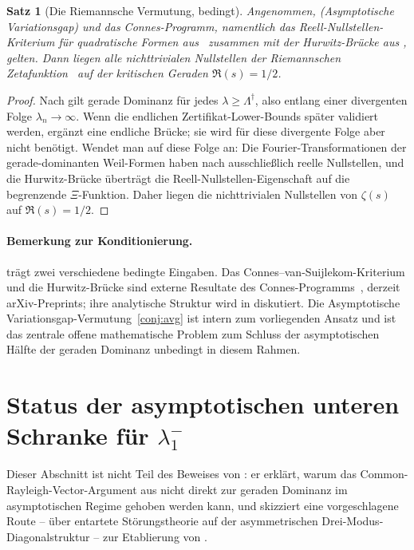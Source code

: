 \documentclass[11pt,a4paper]{article}
\newtheorem{theorem}{Satz}[section]
\theoremstyle{remark}
\theoremstyle{plain}
\begin{document}
\begin{theorem}[Die Riemannsche Vermutung, bedingt]
\label{thm:rh}
Angenommen,  (Asymptotische Variationsgap) und das Connes-Programm, namentlich das Reell-Nullstellen-Kriterium für quadratische Formen aus~\cite{ConnesvS2025} zusammen mit der Hurwitz-Brücke aus \cite[Fact~6.4 und Abschnitt~6.4--6.6]{Connes2026}, gelten. Dann liegen alle nichttrivialen Nullstellen der Riemannschen Zetafunktion~\cite{Riemann1859} auf der kritischen Geraden $\Re(s)=1/2$.
\end{theorem}

\begin{proof}
\sloppy
Nach  gilt gerade Dominanz für jedes $\lambda\geq\Lambda^\dagger$, also entlang einer divergenten Folge $\lambda_n\to\infty$. Wenn die endlichen Zertifikat-Lower-Bounds später validiert werden, ergänzt  eine endliche Brücke; sie wird für diese divergente Folge aber nicht benötigt. Wendet man  auf diese Folge an: Die Fourier-Transformationen der gerade-dominanten Weil-Formen haben nach  ausschließlich reelle Nullstellen, und die Hurwitz-Brücke überträgt die Reell-Nullstellen-Eigenschaft auf die begrenzende $\Xi$-Funktion. Daher liegen die nichttrivialen Nullstellen von $\zeta(s)$ auf $\Re(s)=1/2$.
\end{proof}

\paragraph{Bemerkung zur Konditionierung.}
 trägt zwei verschiedene bedingte Eingaben. Das Connes--van-Suijlekom-Kriterium und die Hurwitz-Brücke sind externe Resultate des Connes-Programms~\cite{Connes2026,ConnesvS2025}, derzeit arXiv-Preprints; ihre analytische Struktur wird in  diskutiert. Die Asymptotische Variationsgap-Vermutung~\ref{conj:avg} ist intern zum vorliegenden Ansatz und ist das zentrale offene mathematische Problem zum Schluss der asymptotischen Hälfte der geraden Dominanz unbedingt in diesem Rahmen.

\section{Status der asymptotischen unteren Schranke für \texorpdfstring{$\lambda_1^-$}{lambda\_1\^{}-}}
\label{sec:asymptotic-lower-bound}

Dieser Abschnitt ist nicht Teil des Beweises von : er erklärt, warum das Common-Rayleigh-Vector-Argument aus  nicht direkt zur geraden Dominanz im asymptotischen Regime gehoben werden kann, und skizziert eine vorgeschlagene Route -- über entartete Störungstheorie auf der asymmetrischen Drei-Modus-Diagonalstruktur -- zur Etablierung von .
\end{document}
